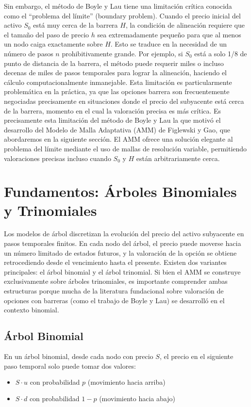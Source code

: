 Sin embargo, el método de Boyle y Lau tiene una limitación crítica conocida como el ``problema del límite'' (boundary problem). Cuando el precio inicial del activo $S_0$ está muy cerca de la barrera $H$, la condición de alineación requiere que el tamaño del paso de precio $h$ sea extremadamente pequeño para que al menos un nodo caiga exactamente sobre $H$. Esto se traduce en la necesidad de un número de pasos $n$ prohibitivamente grande. Por ejemplo, si $S_0$ está a solo 1/8 de punto de distancia de la barrera, el método puede requerir miles o incluso decenas de miles de pasos temporales para lograr la alineación, haciendo el cálculo computacionalmente inmanejable. Esta limitación es particularmente problemática en la práctica, ya que las opciones barrera son frecuentemente negociadas precisamente en situaciones donde el precio del subyacente está cerca de la barrera, momento en el cual la valoración precisa es más crítica. Es precisamente esta limitación del método de Boyle y Lau la que motivó el desarrollo del Modelo de Malla Adaptativa (AMM) de Figlewski y Gao, que abordaremos en la siguiente sección. El AMM ofrece una solución elegante al problema del límite mediante el uso de mallas de resolución variable, permitiendo valoraciones precisas incluso cuando $S_0$ y $H$ están arbitrariamente cerca.


\section{Fundamentos: Árboles Binomiales y Trinomiales}

Los modelos de árbol discretizan la evolución del precio del activo subyacente en pasos temporales finitos. En cada nodo del árbol, el precio puede moverse hacia un número limitado de estados futuros, y la valoración de la opción se obtiene retrocediendo desde el vencimiento hasta el presente. Existen dos variantes principales: el árbol binomial y el árbol trinomial. Si bien el AMM se construye exclusivamente sobre árboles trinomiales, es importante comprender ambas estructuras porque mucha de la literatura fundacional sobre valoración de opciones con barreras (como el trabajo de Boyle y Lau) se desarrolló en el contexto binomial.

\subsection{Árbol Binomial}

En un árbol binomial, desde cada nodo con precio $S$, el precio en el siguiente paso temporal solo puede tomar dos valores:
\begin{itemize}
    \item $S \cdot u$ con probabilidad $p$ (movimiento hacia arriba)
    \item $S \cdot d$ con probabilidad $1-p$ (movimiento hacia abajo)
\end{itemize}

